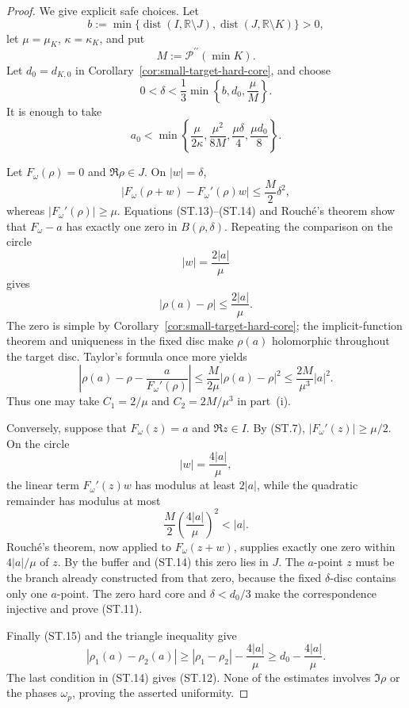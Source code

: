 \documentclass[11pt]{article}
\theoremstyle{definition}
\theoremstyle{remark}
\newcommand{\cP}{\mathcal P}
\newcommand{\R}{\mathbb R}
\begin{document}
\begin{proof}
We give explicit safe choices.  Let
\[
 b:=\min\bigl\{
   \operatorname{dist}(I,\R\setminus J),
   \operatorname{dist}(J,\R\setminus K)
 \bigr\}>0,
\]
let $\mu=\mu_K$, $\kappa=\kappa_K$, and put
\[
 M:=\cP^{\prime\prime}(\min K).
\]
Let $d_0=d_{K,0}$ in Corollary~\ref{cor:small-target-hard-core}, and choose
\[
 0<\delta<\frac13\min\left\{b,d_0,\frac{\mu}{M}\right\}.
 \tag{ST.13}
\]
It is enough to take
\[
 a_0<\min\left\{
  \frac{\mu}{2\kappa},
  \frac{\mu^2}{8M},
  \frac{\mu\delta}{4},
  \frac{\mu d_0}{8}
 \right\}.
 \tag{ST.14}
\]

Let $F_\omega(\rho)=0$ and $\Re\rho\in J$.  On $|w|=\delta$,
\[
 \left|F_\omega(\rho+w)-F_\omega'(\rho)w\right|
 \le\frac{M}{2}\delta^2,
\]
whereas $|F_\omega'(\rho)|\ge\mu$.  Equations (ST.13)--(ST.14) and
Rouch\'e's theorem show that $F_\omega-a$ has exactly one zero in
$B(\rho,\delta)$.  Repeating the comparison on the circle
\[
 |w|=\frac{2|a|}{\mu}
\]
gives
\[
 |\rho(a)-\rho|\le\frac{2|a|}{\mu}.
 \tag{ST.15}
\]
The zero is simple by Corollary~\ref{cor:small-target-hard-core}; the implicit-function
theorem and uniqueness in the fixed disc make $\rho(a)$ holomorphic throughout the
target disc.  Taylor's formula once more yields
\[
 \left|\rho(a)-\rho-\frac{a}{F_\omega'(\rho)}\right|
 \le \frac{M}{2\mu}|\rho(a)-\rho|^2
 \le\frac{2M}{\mu^3}|a|^2.
 \tag{ST.16}
\]
Thus one may take $C_1=2/\mu$ and $C_2=2M/\mu^3$ in part~(i).

Conversely, suppose that $F_\omega(z)=a$ and $\Re z\in I$.  By (ST.7),
$|F_\omega'(z)|\ge\mu/2$.  On the circle
\[
 |w|=\frac{4|a|}{\mu},
\]
the linear term $F_\omega'(z)w$ has modulus at least $2|a|$, while the quadratic
remainder has modulus at most
\[
 \frac{M}{2}\left(\frac{4|a|}{\mu}\right)^2<|a|.
\]
Rouch\'e's theorem, now applied to $F_\omega(z+w)$, supplies exactly one zero within
$4|a|/\mu$ of $z$.  By the buffer and (ST.14) this zero lies in $J$.  The $a$-point
$z$ must be the branch already constructed from that zero, because the fixed
$\delta$-disc contains only one $a$-point.  The zero hard core and
$\delta<d_0/3$ make the correspondence injective and prove (ST.11).

Finally (ST.15) and the triangle inequality give
\[
 |\rho_1(a)-\rho_2(a)|
 \ge |\rho_1-\rho_2|-\frac{4|a|}{\mu}
 \ge d_0-\frac{4|a|}{\mu}.
\]
The last condition in (ST.14) gives (ST.12).  None of the estimates involves
$\Im\rho$ or the phases $\omega_p$, proving the asserted uniformity.
\end{proof}
\end{document}
